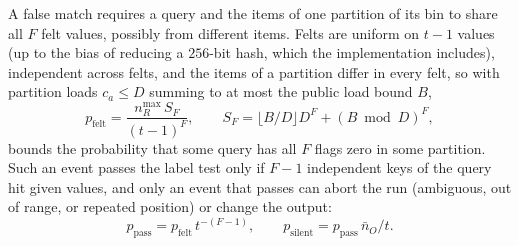 A false match requires a query and the items of one partition of its bin to share all $F$ felt values, possibly from different items. Felts are uniform on $t - 1$ values (up to the bias of reducing a $256$-bit hash, which the implementation includes), independent across felts, and the items of a partition differ in every felt, so with partition loads $c_a \le D$ summing to at most the public load bound $B$,
\[
  p_{\mathrm{felt}} = \frac{n_R^{\max}\, S_F}{(t - 1)^F}, \qquad S_F = \lfloor B/D \rfloor D^F + (B \bmod D)^F,
\]
bounds the probability that some query has all $F$ flags zero in some partition. Such an event passes the label test only if $F - 1$ independent keys of the query hit given values, and only an event that passes can abort the run (ambiguous, out of range, or repeated position) or change the output:
\[
  p_{\mathrm{pass}} = p_{\mathrm{felt}}\, t^{-(F - 1)}, \qquad p_{\mathrm{silent}} = p_{\mathrm{pass}}\, \bar n_O / t .
\]
